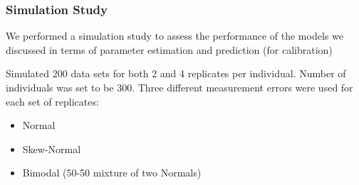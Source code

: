 \documentclass[handout]{beamer}\usepackage[]{graphicx}\usepackage[]{color}
\begin{document}
\begin{frame}
\frametitle{Simulation Study}
We performed a simulation study to assess the performance of the models we discussed in terms of parameter estimation and prediction (for calibration)

\vspace{0.2cm}

Simulated 200 data sets for both 2 and 4 replicates per individual. Number of individuals was set to be 300. Three different measurement errors were used for each set of replicates:

\begin{itemize}
\item
Normal
\item
Skew-Normal
\item
Bimodal (50-50 mixture of two Normals)
\end{itemize}

\end{frame}
\end{document}

